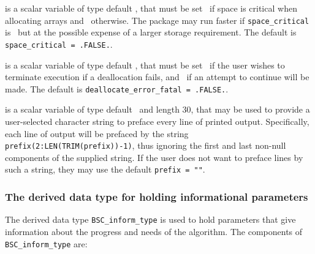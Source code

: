 \documentclass{galahad}
\newcommand{\packagename}{BSC}
\begin{document}
\begin{description}
 is a scalar variable of type default \logical, 
that must be set \true\ if space is critical when allocating arrays
and  \false\ otherwise. The package may run faster if 
{\tt space\_critical} is \false\ but at the possible expense of a larger
storage requirement. The default is {\tt space\_critical = .FALSE.}.

 is a scalar variable of type default \logical, 
that must be set \true\ if the user wishes to terminate execution if
a deallocation  fails, and \false\ if an attempt to continue
will be made. The default is {\tt deallocate\_error\_fatal = .FALSE.}.

 is a scalar variable of type default \character\
and length 30, that may be used to provide a user-selected 
character string to preface every line of printed output. 
Specifically, each line of output will be prefaced by the string 
{\tt prefix(2:LEN(TRIM(prefix))-1)},
thus ignoring the first and last non-null components of the
supplied string. If the user does not want to preface lines by such
a string, they may use the default {\tt prefix = ""}.

\end{description}


\subsubsection{The derived data type for holding informational
 parameters}\label{typeinform}
The derived data type 
{\tt \packagename\_inform\_type} 
is used to hold parameters that give information about the progress and needs 
of the algorithm. The components of 
{\tt \packagename\_inform\_type} 
are:
\end{document}
